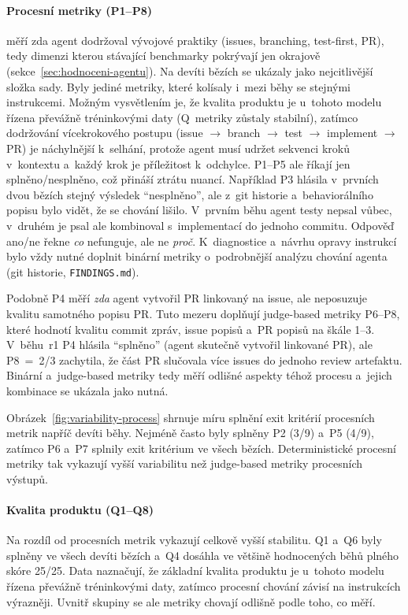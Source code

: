 \paragraph{Procesní metriky (P1--P8)}
 měří zda agent dodržoval vývojové praktiky (issues, branching,
test-first, PR), tedy dimenzi kterou stávající benchmarky
pokrývají jen okrajově (sekce~\ref{sec:hodnoceni-agentu}). Na devíti
bězích se ukázaly
jako nejcitlivější složka sady. Byly jediné metriky, které
kolísaly i~mezi běhy se stejnými instrukcemi. Možným vysvětlením
je, že kvalita produktu je u~tohoto modelu řízena převážně tréninkovými
daty (Q~metriky zůstaly stabilní), zatímco dodržování vícekrokového
postupu (issue $\to$ branch $\to$ test $\to$ implement $\to$ PR)
je náchylnější k~selhání, protože agent musí udržet sekvenci kroků
v~kontextu a~každý krok je příležitost k~odchylce.
\acs{P1}--\acs{P5} ale říkají jen splněno/nesplněno, což přináší ztrátu nuancí.
Například \ac{P3} hlásila v~prvních dvou bězích stejný
výsledek ``nesplněno'', ale z~git historie a~behaviorálního popisu
bylo vidět, že se chování lišilo. V~prvním běhu agent testy nepsal
vůbec, v~druhém je psal ale kombinoval s~implementací do jednoho
commitu. Odpověď ano/ne řekne \textit{co} nefunguje, ale ne
\textit{proč}. K~diagnostice a~návrhu opravy instrukcí bylo
vždy nutné doplnit binární metriky o~podrobnější analýzu chování
agenta (git historie, \texttt{FINDINGS.md}).

Podobně \acs{P4} měří \textit{zda} agent vytvořil PR linkovaný na issue,
ale neposuzuje kvalitu samotného popisu PR. Tuto mezeru doplňují
judge-based metriky \acs{P6}--\acs{P8}, které hodnotí kvalitu commit
zpráv, issue popisů a~PR popisů na škále 1--3. V~běhu~r1 \acs{P4}
hlásila ``splněno'' (agent skutečně vytvořil linkované PR), ale
\acs{P8}~=~2/3 zachytila, že část PR slučovala více issues do jednoho
review artefaktu. Binární a~judge-based metriky
tedy měří odlišné aspekty téhož procesu a~jejich kombinace se ukázala
jako nutná.

Obrázek~\ref{fig:variability-process} shrnuje míru splnění exit
kritérií procesních metrik napříč devíti běhy. Nejméně často byly
splněny \acs{P2} (3/9) a~\acs{P5} (4/9), zatímco \acs{P6} a~\acs{P7}
splnily exit kritérium ve všech bězích. Deterministické procesní
metriky tak vykazují vyšší variabilitu než judge-based metriky
procesních výstupů.



\paragraph{Kvalita produktu (Q1--Q8)}
Na rozdíl od procesních metrik vykazují  celkově vyšší
stabilitu. \ac{Q1} a~\ac{Q6} byly splněny ve všech devíti bězích
a~\ac{Q4} dosáhla ve většině hodnocených běhů plného skóre 25/25.
Data naznačují, že základní kvalita produktu
je u~tohoto modelu řízena převážně tréninkovými daty, zatímco
procesní chování závisí na instrukcích výrazněji. Uvnitř skupiny
se ale metriky chovají odlišně podle toho, co měří.

